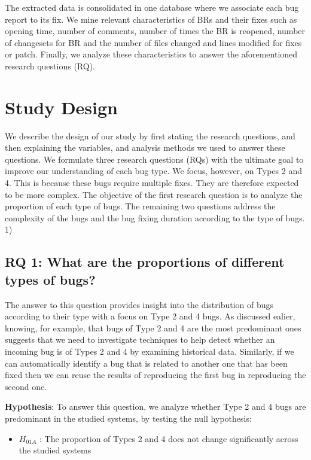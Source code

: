 The extracted data is
consolidated in one database where we associate each bug
report to its fix. We mine relevant characteristics of BRs and
their fixes such as opening time, number of comments,
number of times the BR is reopened, number of changesets
for BR and the number of files changed and lines modified
for fixes or patch. Finally, we analyze these characteristics to
answer the aforementioned research questions (RQ).


\section{Study Design}

We describe the design of our study by first stating the
research questions, and then explaining the variables, and
analysis methods we used to answer these questions. We
formulate three research questions (RQs) with the ultimate
goal to improve our understanding of each bug type. We
focus, however, on Types 2 and 4. This is because these bugs
require multiple fixes. They are therefore expected to be more
complex.
The objective of the first research question is to analyze
the proportion of each type of bugs. The remaining two
questions address the complexity of the bugs and the bug
fixing duration according to the type of bugs.
1)

\subsection{RQ 1: What are the proportions of different types of bugs?}

The answer to this question provides insight into the
distribution of bugs according to their type with a focus on
Type 2 and 4 bugs. As discussed ealier, knowing, for
example, that bugs of Type 2 and 4 are the most predominant
ones suggests that we need to investigate techniques to help
detect whether an incoming bug is of Types 2 and 4 by
examining historical data. Similarly, if we can automatically
identify a bug that is related to another one that has been fixed
then we can reuse the results of reproducing the first bug in
reproducing the second one.

{\bf Hypothesis}: To answer this question, we analyze whether
Type 2 and 4 bugs are predominant in the studied systems, by
testing the null hypothesis:

\begin{itemize}
	\item $H_{01A}$ : The proportion of Types 2 and 4 does not
change significantly across the studied systems
\end{itemize}


